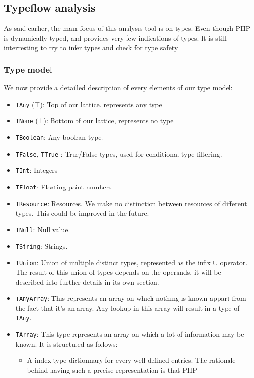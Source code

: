 \documentclass[a4paper]{article}
\begin{document}
\subsection{Typeflow analysis}
As said earlier, the main focus of this analysis tool is on types. Even though
PHP is dynamically typed, and provides very few indications of types. It is
still interresting to try to infer types and check for type safety.

\subsubsection{Type model}
We now provide a detailled description of every elements of our type model:
\begin{itemize}
  \item \verb=TAny= ($\top$): Top of our lattice, represents any type
  \item \verb=TNone= ($\bot$): Bottom of our lattice, represents no type
  \item \verb=TBoolean=: Any boolean type.
  \item \verb=TFalse=, \verb=TTrue= : True/False types, used for conditional
    type filtering.
  \item \verb=TInt=: Integers
  \item \verb=TFloat=: Floating point numbers
  \item \verb=TResource=: Resources. We make no distinction between resources
    of different types. This could be improved in the future.
  \item \verb=TNull=: Null value.
  \item \verb=TString=: Strings.
  \item \verb=TUnion=: Union of multiple distinct types, represented as the
    infix $\cup$ operator. The result of this union of types depends on the operands,
    it will be described into further details in its own section.
  \item \verb=TAnyArray=: This represents an array on which nothing is known
    appart from the fact that it's an array. Any lookup in this array will
    result in a type of \verb=TAny=.
  \item \verb=TArray=: This type represents an array on which a lot of information
    may be known. It is structured as follows:
    \begin{itemize}
        \item A index-type dictionnary for every well-defined entries. The
          rationale behind having such a precise representation is that PHP

\end{itemize}
\end{itemize}
\end{document}
